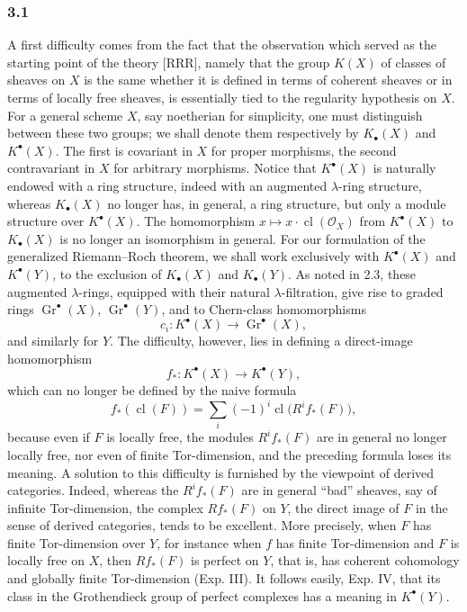\documentclass[11pt]{article}
\newcommand{\Gr}{\operatorname{Gr}}
\newcommand{\cl}{\operatorname{cl}}
\begin{document}
\subsubsection*{3.1}
A first difficulty comes from the fact that the observation which served as the starting point of the theory [RRR], namely that the group $K(X)$ of classes of sheaves on $X$ is the same whether it is defined in terms of coherent sheaves or in terms of locally free sheaves, is essentially tied to the regularity hypothesis on $X$. For a general scheme $X$, say noetherian for simplicity, one must distinguish between these two groups; we shall denote them respectively by $K_\bullet(X)$ and $K^\bullet(X)$. The first is covariant in $X$ for proper morphisms, the second contravariant in $X$ for arbitrary morphisms. Notice that $K^\bullet(X)$ is naturally endowed with a ring structure, indeed with an augmented $\lambda$-ring structure, whereas $K_\bullet(X)$ no longer has, in general, a ring structure, but only a module structure over $K^\bullet(X)$. The homomorphism $x\mapsto x\cdot\cl(\mathcal O_X)$ from $K^\bullet(X)$ to $K_\bullet(X)$ is no longer an isomorphism in general. For our formulation of the generalized Riemann--Roch theorem, we shall work exclusively with $K^\bullet(X)$ and $K^\bullet(Y)$, to the exclusion of $K_\bullet(X)$ and $K_\bullet(Y)$. As noted in 2.3, these augmented $\lambda$-rings, equipped with their natural $\lambda$-filtration, give rise to graded rings $\Gr^\bullet(X)$, $\Gr^\bullet(Y)$, and to Chern-class homomorphisms
\[
c_i:K^\bullet(X)\longrightarrow \Gr^\bullet(X),
\]
and similarly for $Y$. The difficulty, however, lies in defining a direct-image homomorphism
\begin{equation}\tag{3.1}
f_*:K^\bullet(X)\longrightarrow K^\bullet(Y),
\end{equation}
which can no longer be defined by the naive formula
\[
f_*(\cl(F))=\sum_i(-1)^i\cl\bigl(R^if_*(F)\bigr),
\]
because even if $F$ is locally free, the modules $R^if_*(F)$ are in general no longer locally free, nor even of finite Tor-dimension, and the preceding formula loses its meaning. A solution to this difficulty is furnished by the viewpoint of derived categories. Indeed, whereas the $R^if_*(F)$ are in general ``bad'' sheaves, say of infinite Tor-dimension, the complex $Rf_*(F)$ on $Y$, the direct image of $F$ in the sense of derived categories, tends to be excellent. More precisely, when $F$ has finite Tor-dimension over $Y$, for instance when $f$ has finite Tor-dimension and $F$ is locally free on $X$, then $Rf_*(F)$ is perfect on $Y$, that is, has coherent cohomology and globally finite Tor-dimension (Exp. III). It follows easily, Exp. IV, that its class in the Grothendieck group of perfect complexes has a meaning in $K^\bullet(Y)$.
\end{document}
